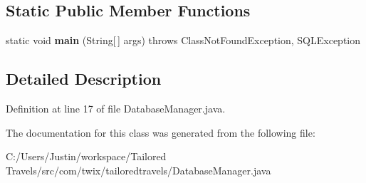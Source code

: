 \subsection*{Static Public Member Functions}
\begin{DoxyCompactItemize}
\item 
\hypertarget{classcom_1_1twix_1_1tailoredtravels_1_1_database_manager_a016f5dba5721c561485b5ef4d3219bc8}{static void {\bfseries main} (String\mbox{[}$\,$\mbox{]} args)  throws Class\-Not\-Found\-Exception, 			\-S\-Q\-L\-Exception }\label{classcom_1_1twix_1_1tailoredtravels_1_1_database_manager_a016f5dba5721c561485b5ef4d3219bc8}

\end{DoxyCompactItemize}


\subsection{Detailed Description}


Definition at line 17 of file Database\-Manager.\-java.



The documentation for this class was generated from the following file\-:\begin{DoxyCompactItemize}
\item 
C\-:/\-Users/\-Justin/workspace/\-Tailored Travels/src/com/twix/tailoredtravels/Database\-Manager.\-java\end{DoxyCompactItemize}
